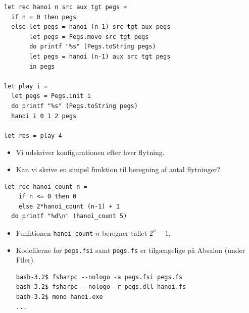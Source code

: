 \documentclass[rgb]{beamer}
\begin{document}
\begin{frame}[fragile]
\begin{footnotesize}

  \vspace{1ex}

\begin{lstlisting}[numbers=none,frame=none,mathescape]
let rec hanoi n src aux tgt pegs =
  if n = 0 then pegs
  else let pegs = hanoi (n-1) src tgt aux pegs
       let pegs = Pegs.move src tgt pegs
       do printf "%s" (Pegs.toString pegs)
       let pegs = hanoi (n-1) aux src tgt pegs
       in pegs

let play i =
  let pegs = Pegs.init i
  do printf "%s" (Pegs.toString pegs)
  hanoi i 0 1 2 pegs

let res = play 4
\end{lstlisting}

\begin{itemize}
\item Vi udskriver konfigurationen efter hver flytning.
\item Kan vi skrive en simpel funktion til beregning af antal flytninger?
\end{itemize}
\end{footnotesize}
\end{frame}

\begin{frame}[fragile]
\begin{footnotesize}

  \vspace{1ex}

\begin{lstlisting}[numbers=none,frame=none,mathescape]
  let rec hanoi_count n =
    if n <= 0 then 0
    else 2*hanoi_count (n-1) + 1
  do printf "%d\n" (hanoi_count 5)
\end{lstlisting}

  \vspace{1ex}

\begin{itemize}
\item
  Funktionen \lstinline{hanoi_count} $n$ beregner tallet $2^n - 1$.
  \item Kodefilerne for \lstinline{pegs.fsi} samt \lstinline{pegs.fs}
    er tilgængelige på Absalon (under Filer).

\begin{verbatim}
bash-3.2$ fsharpc --nologo -a pegs.fsi pegs.fs
bash-3.2$ fsharpc --nologo -r pegs.dll hanoi.fs
bash-3.2$ mono hanoi.exe
...
\end{verbatim}
    \end{itemize}
\end{footnotesize}
\end{frame}
\end{document}

